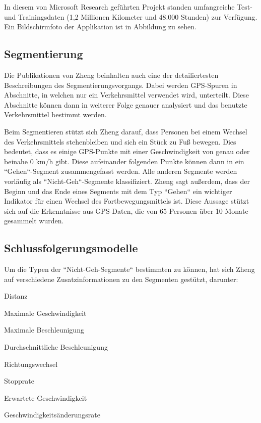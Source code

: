 In diesem von Microsoft Research geführten Projekt standen umfangreiche Test- und Trainingsdaten (1,2 Millionen Kilometer und 48.000 Stunden) zur Verfügung. \cite{microsoft_research_geolife_2015} Ein Bildschirmfoto der Applikation ist in Abbildung  zu sehen. 

\subsection{Segmentierung}
Die Publikationen von Zheng beinhalten auch eine der detailiertesten Beschreibungen des Segmentierungsvorgangs. Dabei werden GPS-Spuren in Abschnitte, in welchen nur ein Verkehrsmittel verwendet wird, unterteilt. Diese Abschnitte können dann in weiterer Folge genauer analysiert und das benutzte Verkehrsmittel bestimmt werden.

Beim Segmentieren stützt sich Zheng darauf, dass Personen bei einem Wechsel des Verkehrsmittels stehenbleiben und sich ein Stück zu Fuß bewegen. Dies bedeutet, dass es einige GPS-Punkte mit einer Geschwindigkeit von genau oder beinahe 0 km/h gibt. Diese aufeinander folgenden Punkte können dann in ein ``Gehen``-Segment zusammengefasst werden. Alle anderen Segmente werden vorläufig als ``Nicht-Geh``-Segmente klassifiziert. Zheng sagt außerdem, dass der Beginn und das Ende eines Segments mit dem Typ ``Gehen`` ein wichtiger Indikator für einen Wechsel des Fortbewegungsmittels ist. Diese Aussage stützt sich auf die Erkenntnisse aus GPS-Daten, die von 65 Personen über 10 Monate gesammelt wurden.

\subsection{Schlussfolgerungsmodelle} \label{schlussfolgerungsmodelle}
Um die Typen der ``Nicht-Geh-Segmente`` bestimmten zu können, hat sich Zheng auf verschiedene Zusatzinformationen zu den Segmenten gestützt, darunter:

\begin{pitemize}
\item Distanz
\item Maximale Geschwindigkeit
\item Maximale Beschleunigung
\item Durchschnittliche Beschleunigung
\item Richtungswechsel
\item Stopprate
\item Erwartete Geschwindigkeit
\item Geschwindigkeitsänderungsrate
\end{pitemize}

